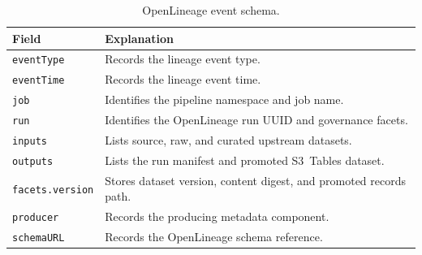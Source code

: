 \begin{table}[H]
  \centering
  \caption{OpenLineage event schema.}
  \label{tab:schema-openlineage}
  \renewcommand{\arraystretch}{1.12}
  \begin{tabularx}{\textwidth}{@{}p{}X@{}}
    \toprule
    \textbf{Field} & \textbf{Explanation} \\
    \midrule
    \texttt{eventType} & Records the lineage event type. \\
    \texttt{eventTime} & Records the lineage event time. \\
    \texttt{job} & Identifies the pipeline namespace and job name. \\
    \texttt{run} & Identifies the OpenLineage run UUID and governance facets. \\
    \texttt{inputs} & Lists source, raw, and curated upstream datasets. \\
    \texttt{outputs} & Lists the run manifest and promoted S3~Tables dataset. \\
    \texttt{facets.version} & Stores dataset version, content digest, and promoted records path. \\
    \texttt{producer} & Records the producing metadata component. \\
    \texttt{schemaURL} & Records the OpenLineage schema reference. \\
    \bottomrule
  \end{tabularx}
\end{table}

